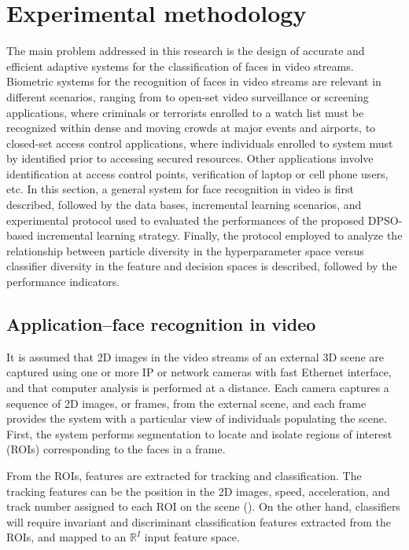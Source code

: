 \section{Experimental methodology}
\label{sec:c2_methodology}

The main problem addressed in this research is the design of accurate and efficient adaptive systems for the classification of faces in video streams.
Biometric systems for the recognition of faces in video streams are relevant in different scenarios, ranging from to open-set video surveillance or screening applications, where criminals or terrorists enrolled to a watch list must be recognized within dense and moving crowds at major events and airports, to closed-set access control applications, where individuals enrolled to system must by identified prior to accessing secured resources.
Other applications involve identification at access control points, verification of laptop or cell phone users, etc.
In this section, a general system for face recognition in video is first described, followed by the data bases, incremental learning
scenarios, and experimental protocol used to evaluated the performances of the proposed DPSO-based incremental learning strategy.
Finally, the protocol employed to analyze the relationship between particle diversity in the hyperparameter space versus classifier diversity in the feature and decision spaces is described, followed by the performance indicators.

\subsection{Application--face recognition in video}

It is assumed that 2D images in the video streams of an external 3D scene are captured using one or more IP or network cameras with fast Ethernet interface, and that computer analysis is performed at a distance.
Each camera captures a sequence of 2D images, or frames, from the external scene, and each frame provides the system with a particular view of individuals populating the scene.
First, the system performs segmentation to locate and isolate regions of interest (ROIs) corresponding to the faces in a frame.

From the ROIs, features are extracted for tracking and classification.
The tracking features can be the position in the 2D images, speed, acceleration, and track number assigned to each ROI on the scene (\cite{granger01}).
On the other hand, classifiers will require invariant and discriminant classification features extracted from the ROIs, and mapped to an $\mathbb{R}^I$ input feature space.

